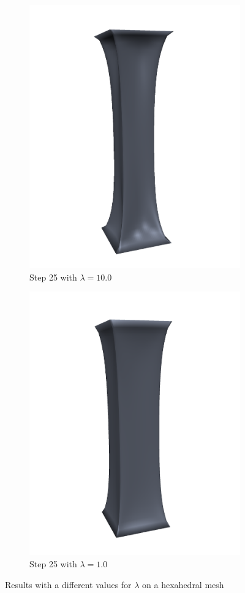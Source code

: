 \begin{figure}[!ht]
\centering
\begin{subfigure}{.47\textwidth}
  \centering
  \includegraphics[width=.8\linewidth]{resources/lambda_comparison_res.png}  
  \caption{Step 25 with $\lambda = 10.0$}
  \label{fig:lambda_1}
\end{subfigure}
\begin{subfigure}{.47\textwidth}
  \centering
  \includegraphics[width=.8\linewidth]{resources/lambda_comparison_lambda.png}  
  \caption{Step 25 with $\lambda = 1.0$}
  \label{fig:lambda_2}
\end{subfigure}
\caption{Results with a different values for $\lambda$ on a hexahedral mesh}
\label{fig:lambda}
\end{figure}

